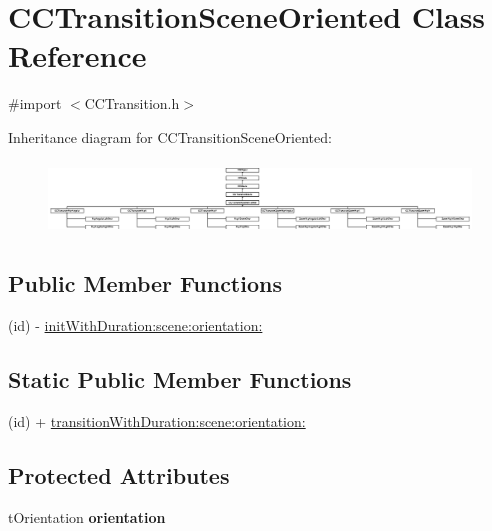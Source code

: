 \hypertarget{interface_c_c_transition_scene_oriented}{\section{C\-C\-Transition\-Scene\-Oriented Class Reference}
\label{interface_c_c_transition_scene_oriented}
}


{\ttfamily \#import $<$C\-C\-Transition.\-h$>$}

Inheritance diagram for C\-C\-Transition\-Scene\-Oriented\-:\begin{figure}[H]
\begin{center}
\leavevmode
\includegraphics[height=1.954625cm]{interface_c_c_transition_scene_oriented}
\end{center}
\end{figure}
\subsection*{Public Member Functions}
\begin{DoxyCompactItemize}
\item 
(id) -\/ \hyperlink{interface_c_c_transition_scene_oriented_a0539da9ef2dde47df1fb6edcdb794494}{init\-With\-Duration\-:scene\-:orientation\-:}
\end{DoxyCompactItemize}
\subsection*{Static Public Member Functions}
\begin{DoxyCompactItemize}
\item 
(id) + \hyperlink{interface_c_c_transition_scene_oriented_af473a390253a6ec07bf0eec6ca35146c}{transition\-With\-Duration\-:scene\-:orientation\-:}
\end{DoxyCompactItemize}
\subsection*{Protected Attributes}
\begin{DoxyCompactItemize}
\item 
\hypertarget{interface_c_c_transition_scene_oriented_afc7a76b174a30861a50827f8e376d4fc}{t\-Orientation {\bfseries orientation}}\label{interface_c_c_transition_scene_oriented_afc7a76b174a30861a50827f8e376d4fc}

\end{DoxyCompactItemize}


